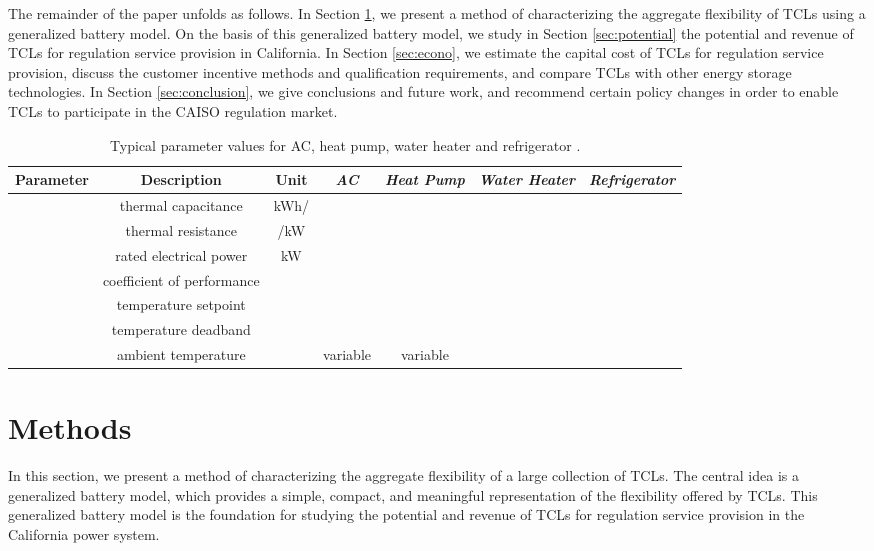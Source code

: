 \documentclass[onecolumn,journal]{IEEEtran}
\begin{document}
The remainder of the paper unfolds as follows. In Section \ref{sec:flexibility}, we present a method of characterizing the aggregate flexibility of \acp{TCL} using a generalized battery model. On the basis of this generalized battery model, we study in Section \ref{sec:potential} the potential and revenue of \acp{TCL} for regulation service provision in California. In Section \ref{sec:econo}, we estimate the capital cost of \acp{TCL} for regulation service provision, discuss the customer incentive methods and qualification requirements, and compare \acp{TCL} with other energy storage technologies. In Section \ref{sec:conclusion}, we give conclusions and future work, and recommend certain policy changes in order to enable \acp{TCL} to participate in the CAISO regulation market.



\begin{table*}[tb]
\caption{Typical parameter values for AC, heat pump, water heater and refrigerator  \cite{mathieu_revenue}.}
{\scriptsize
\label{tab:model_parameters}
\begin{center}
\begin{tabular}{ccccccc}
\hline
Parameter & Description & Unit & \emph{AC} &  \emph{Heat Pump} &  \emph{Water Heater} &  \emph{Refrigerator} \\
\hline 
 & thermal capacitance  & kWh/ &  & &  &\\
 & thermal resistance  & /kW &   & & & \\
 & rated electrical power  & kW &   &  & & \\
 & coefficient of performance  &  & &  &  & \\
 & temperature setpoint  & &  & &  & \\
 & temperature deadband  &  &  & & & \\
 & ambient temperature &  & variable & variable& & \\
\hline
\end{tabular}
\end{center}
}
\end{table*}

\section{Methods}
\label{sec:flexibility}
In this section, we present a method of characterizing the aggregate flexibility of a large collection of \acp{TCL}. The central idea is a generalized battery model, which provides a simple, compact, and meaningful representation of the flexibility offered by \acp{TCL}. This generalized battery model is the foundation for studying the potential and revenue of \acp{TCL} for regulation service provision in the California power system. 
\end{document}
